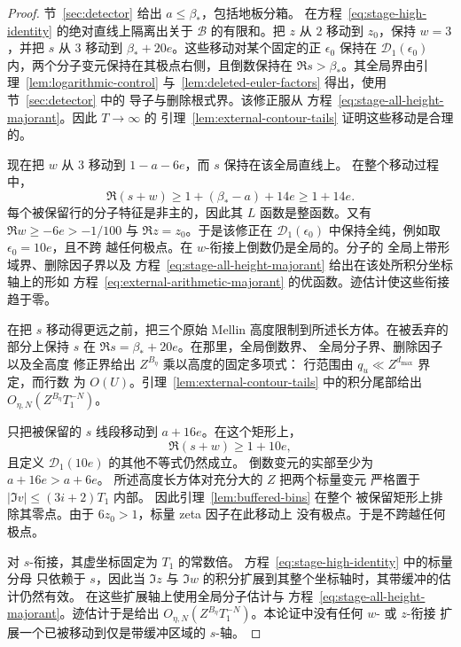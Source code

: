 \documentclass[11pt,a4paper]{article}
\numberwithin{equation}{section}
\numberwithin{figure}{section}
\theoremstyle{definition}
\theoremstyle{remark}
\begin{document}
\begin{proof}

节~\ref{sec:detector} 给出 $a\le\beta_*$，包括地板分箱。
在方程~\eqref{eq:stage-high-identity} 的绝对直线上隔离出关于 $\mathcal B$
的有限和。把
$z$ 从 $2$ 移动到 $z_0$，保持 $w=3$，并把 $s$ 从 $3$ 移动到
$\beta_*+20e$。这些移动对某个固定的正 $\epsilon_0$ 保持在 $\mathcal D_1(\epsilon_0)$
内，两个分子变元保持在其极点右侧，且倒数保持在
$\Re s>\beta_*$。其全局界由引理~\ref{lem:logarithmic-control}
与~\ref{lem:deleted-euler-factors} 得出，使用节~\ref{sec:detector} 中的
导子与删除根式界。该修正服从
方程~\eqref{eq:stage-all-height-majorant}。因此 $T\to\infty$ 的
引理~\ref{lem:external-contour-tails} 证明这些移动是合理的。

现在把 $w$ 从 $3$ 移动到 $1-a-6e$，而 $s$ 保持在该全局直线上。
在整个移动过程中，
\[
 \Re(s+w)\ge1+(\beta_*-a)+14e\ge1+14e.
\]
每个被保留行的分子特征是非主的，因此其
$L$ 函数是整函数。又有 $\Re w\ge-6e>-1/100$ 与
$\Re z=z_0$。于是该修正在
$\mathcal D_1(\epsilon_0)$ 中保持全纯，例如取 $\epsilon_0=10e$，且不跨
越任何极点。在 $w$-衔接上倒数仍是全局的。分子的
全局上带形域界、删除因子界以及
方程~\eqref{eq:stage-all-height-majorant} 给出在该处所积分坐标轴上的形如
方程~\eqref{eq:external-arithmetic-majorant} 的优函数。迹估计使这些衔接趋于零。

在把 $s$ 移动得更远之前，把三个原始 Mellin 高度限制到所述长方体。在被丢弃的
部分上保持 $s$ 在 $\Re s=\beta_*+20e$。在那里，全局倒数界、
全局分子界、删除因子以及全高度
修正界给出 $Z^{B_\eta}$ 乘以高度的固定多项式：
行范围由 $q_u\ll Z^{d_{\max}}$ 界定，而行数
为 $O(U)$。引理~\ref{lem:external-contour-tails} 中的积分尾部给出
$O_{\eta,N}(Z^{B_\eta}T_1^{-N})$。

只把被保留的 $s$ 线段移动到 $a+16e$。在这个矩形上，
\[
 \Re(s+w)\ge1+10e,
\]
且定义 $\mathcal D_1(10e)$ 的其他不等式仍然成立。
倒数变元的实部至少为 $a+16e>a+6e$。
所述高度长方体对充分大的 $Z$ 把两个标量变元
严格置于 $|\Im v|\le(3i+2)T_1$ 内部。
因此引理~\ref{lem:buffered-bins} 在整个
被保留矩形上排除其零点。由于 $6z_0>1$，标量 zeta 因子在此移动上
没有极点。于是不跨越任何极点。

对 $s$-衔接，其虚坐标固定为 $T_1$ 的常数倍。
方程~\eqref{eq:stage-high-identity} 中的标量分母
只依赖于 $s$，因此当
$\Im z$ 与 $\Im w$ 的积分扩展到其整个坐标轴时，其带缓冲的估计仍然有效。
在这些扩展轴上使用全局分子估计与
方程~\eqref{eq:stage-all-height-majorant}。迹估计于是给出
$O_{\eta,N}(Z^{B_\eta}T_1^{-N})$。本论证中没有任何 $w$- 或 $z$-衔接
扩展一个已被移动到仅是带缓冲区域的 $s$-轴。

\end{proof}
\end{document}
